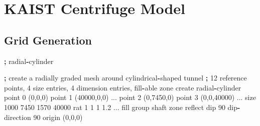 \documentclass[a4paper, nobind]{templates/ociamthesis}
\newenvironment{Shaded}{\begin{snugshade}}{\end{snugshade}}
\newcommand{\DecValTok}[1]{\textcolor[rgb]{0.00,0.00,0.81}{#1}}
\newcommand{\FloatTok}[1]{\textcolor[rgb]{0.00,0.00,0.81}{#1}}
\newcommand{\NormalTok}[1]{#1}
\newcommand{\OperatorTok}[1]{\textcolor[rgb]{0.81,0.36,0.00}{\textbf{#1}}}
\newcommand{\StringTok}[1]{\textcolor[rgb]{0.31,0.60,0.02}{#1}}
\renewenvironment{Shaded}
{
  \vspace{10pt}%
  \begin{snugshade}%
}{%
  \end{snugshade}%
  \vspace{8pt}%
}
\begin{document}
\hypertarget{kaist-centrifuge-model}{%
\chapter{KAIST Centrifuge Model}\label{kaist-centrifuge-model}}

\hypertarget{grid-generation}{%
\section{Grid Generation}\label{grid-generation}}

\begin{Shaded}
\begin{Highlighting}[]
\OperatorTok{;}\NormalTok{ radial}\OperatorTok{{-}}\NormalTok{cylinder}

\OperatorTok{;}\NormalTok{ create a radially graded mesh around cylindrical}\OperatorTok{{-}}\NormalTok{shaped tunnel}
\OperatorTok{;} \DecValTok{12}\NormalTok{ reference points, }\DecValTok{4}\NormalTok{ size entries, }\DecValTok{4}\NormalTok{ dimension entries, fill}\OperatorTok{{-}}\NormalTok{able}
\NormalTok{zone create radial}\OperatorTok{{-}}\NormalTok{cylinder point }\DecValTok{0}\NormalTok{ (}\DecValTok{0}\NormalTok{,}\DecValTok{0}\NormalTok{,}\DecValTok{0}\NormalTok{)  point }\DecValTok{1}\NormalTok{ (}\DecValTok{40000}\NormalTok{,}\DecValTok{0}\NormalTok{,}\DecValTok{0}\NormalTok{) ...}
\NormalTok{                            point }\DecValTok{2}\NormalTok{ (}\DecValTok{0}\NormalTok{,}\DecValTok{7450}\NormalTok{,}\DecValTok{0}\NormalTok{) point }\DecValTok{3}\NormalTok{ (}\DecValTok{0}\NormalTok{,}\DecValTok{0}\NormalTok{,}\DecValTok{40000}\NormalTok{) ...}
\NormalTok{                            size }\DecValTok{1000} \DecValTok{7450} \DecValTok{1570} \DecValTok{40000}\NormalTok{ rat }\DecValTok{1} \DecValTok{1} \DecValTok{1} \FloatTok{1.2}\NormalTok{ ...}
\NormalTok{                            fill group }\StringTok{\textquotesingle{}shaft\textquotesingle{}}
\NormalTok{zone reflect dip }\DecValTok{90}\NormalTok{ dip}\OperatorTok{{-}}\NormalTok{direction }\DecValTok{90}\NormalTok{ origin (}\DecValTok{0}\NormalTok{,}\DecValTok{0}\NormalTok{,}\DecValTok{0}\NormalTok{)}


\end{Highlighting}
\end{Shaded}
\end{document}
